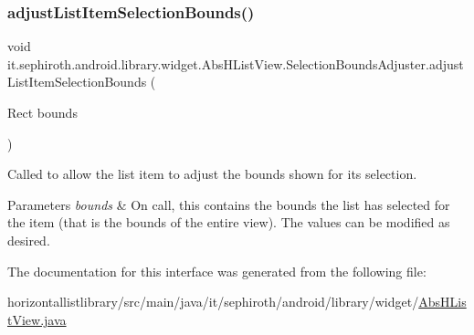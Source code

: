 \subsubsection{\texorpdfstring{adjust\+List\+Item\+Selection\+Bounds()}{adjustListItemSelectionBounds()}}
{\footnotesize\ttfamily void it.\+sephiroth.\+android.\+library.\+widget.\+Abs\+H\+List\+View.\+Selection\+Bounds\+Adjuster.\+adjust\+List\+Item\+Selection\+Bounds (\begin{DoxyParamCaption}\item[{Rect}]{bounds }\end{DoxyParamCaption})}

Called to allow the list item to adjust the bounds shown for its selection.


\begin{DoxyParams}{Parameters}
{\em bounds} & On call, this contains the bounds the list has selected for the item (that is the bounds of the entire view). The values can be modified as desired. \\
\hline
\end{DoxyParams}


The documentation for this interface was generated from the following file\+:\begin{DoxyCompactItemize}
\item 
horizontallistlibrary/src/main/java/it/sephiroth/android/library/widget/\hyperlink{_abs_h_list_view_8java}{Abs\+H\+List\+View.\+java}\end{DoxyCompactItemize}
